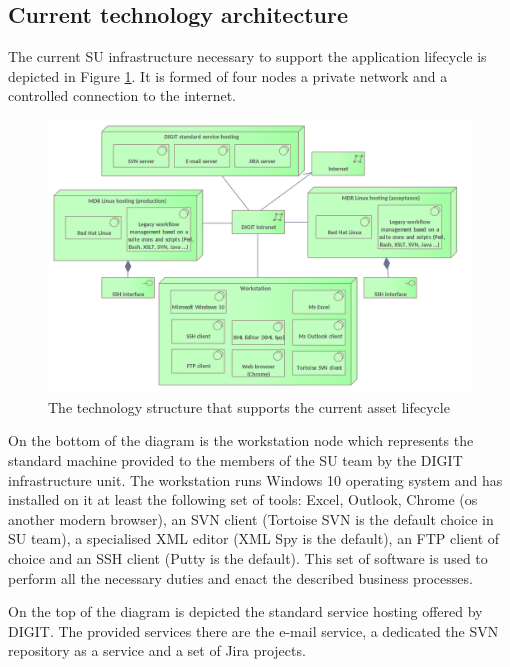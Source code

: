 	\subsection{Current technology architecture}
	\label{sec:technology-current}
	
	The current SU infrastructure necessary to support the application lifecycle is depicted in Figure \ref{fig:technology-current}. It is formed of four nodes a private network and a controlled connection to the internet. 
	
	\begin{figure}[!h]
		\centering
		\includegraphics[width=1.01\textwidth]{images/technology/Current Platform.png}
		\caption{The technology structure that supports the current asset lifecycle}
		\label{fig:technology-current}
	\end{figure}
	
	On the bottom of the diagram is the workstation node which represents the standard machine provided to the members of the SU team by the DIGIT infrastructure unit. The workstation runs Windows 10 \citep{windows10} operating system and has installed on it at least the following set of tools: Excel, Outlook, Chrome (os another modern browser), an SVN client (Tortoise SVN is the default choice in SU team), a specialised XML editor (XML Spy is the default), an FTP client of choice and an SSH client (Putty is the default). This set of software is used to perform all the necessary duties and enact the described business processes. 
	
	On the top of the diagram is depicted the standard service hosting offered by DIGIT. The provided services there are the e-mail service, a dedicated the SVN repository as a service and a set of Jira projects.
	
